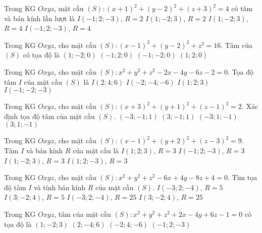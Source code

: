 \begin{ex}%
	Trong KG $Oxyz$, mặt cầu $(S)\colon (x+1)^2+(y-2)^2+(z+3)^2=4$ có tâm và bán kính lần lượt là
	\choice
	{\True $I(-1;2;-3)$, $R=2$}
	{$I(1;-2;3)$, $R=2$}
	{$I(1;-2;3)$, $R=4$}
	{$I(-1;2;-3)$, $R=4$}
\end{ex}
\begin{ex}%
	Trong KG $Oxyz$, cho mặt cầu $(S)\colon (x-1)^2+(y-2)^2+z^2=16$. Tâm của $(S)$ có tọa độ là
	\choice
	{$(1;-2;0)$}
	{$(-1;2;0)$}
	{$(-1;-2;0)$}
	{\True $(1;2;0)$}
\end{ex}
\begin{ex}%
	Trong KG $Oxyz$, cho mặt cầu $(S)\colon x^2+y^2+z^2-2x-4y-6z-2=0$. Tọa độ tâm $I$ của mặt cầu $(S)$ là
	\choice
	{$I(2;4;6)$}
	{$I(-2;-4;-6)$}
	{\True $I(1;2;3)$}
	{$I(-1;-2;-3)$}
\end{ex}
\begin{ex}%
	Trong KG $Oxyz$, cho mặt cầu $(S)\colon (x+3)^2+(y+1)^2+(z-1)^2=2$. Xác định tọa độ tâm của mặt cầu $(S)$.
	\choice
	{\True $(-3;-1;1)$}
	{$(3;-1;1)$}
	{$(-3;1;-1)$}
	{$(3;1;-1)$}
\end{ex}
\begin{ex}%
	Trong KG $Oxyz$, cho mặt cầu $(S)\colon (x-1)^2+(y+2)^2+(z-3)^2=9$. Tâm $I$ và bán kính $R$ của mặt cầu là
	\choice
	{$I(1;2;3)$, $R=3$}
	{$I(-1;2;-3)$, $R=3$}
	{\True $I(1;-2;3)$, $R=3$}
	{$I(1;2;-3)$, $R=3$}
\end{ex}
\begin{ex}%
	Trong KG $Oxyz$, cho mặt cầu $(S)\colon x^2+y^2+z^2-6x+4y-8z+4=0$. Tìm tọa độ tâm $I$ và tính bán kính $R$ của mặt cầu $(S)$.
	\choice
	{$I(-3;2;-4)$, $R=5$}
	{\True $I(3;-2;4)$, $R=5$}
	{$I(-3;2;-4)$, $R=25$}
	{$I(3;-2;4)$, $R=25$}
\end{ex}
\begin{ex}%
	Trong KG $Oxyz$, tâm của mặt cầu $(S)\colon x^2+y^2+z^2+2x-4y+6z-1=0$ có tọa độ là
	\choice
	{$(1;-2;3)$}
	{$(2;-4;6)$}
	{$(-2;4;-6)$}
	{\True $(-1;2;-3)$}
\end{ex}
